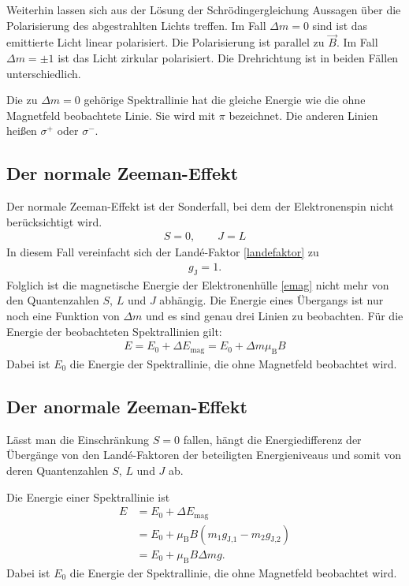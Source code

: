 Weiterhin lassen sich aus der Lösung der Schrödingergleichung Aussagen über die Polarisierung des abgestrahlten Lichts treffen.
Im Fall $\Delta m = 0$ sind ist das emittierte Licht linear polarisiert.
Die Polarisierung ist parallel zu $\vec{B}$.
Im Fall $\Delta m = \pm 1$ ist das Licht zirkular polarisiert.
Die Drehrichtung ist in beiden Fällen unterschiedlich.

Die zu $\Delta m = 0$ gehörige Spektrallinie hat die gleiche Energie wie die ohne Magnetfeld beobachtete Linie.
Sie wird mit $\pi$ bezeichnet.
Die anderen Linien heißen $\sigma^+$ oder $\sigma^-$.

\subsection{Der normale Zeeman-Effekt}
Der normale Zeeman-Effekt ist der Sonderfall, bei dem der Elektronenspin nicht berücksichtigt wird.
\begin{align}
	S = 0, \quad \quad J = L
\end{align}
In diesem Fall vereinfacht sich der Landé-Faktor \eqref{landefaktor} zu
\begin{align}
	g_\text{J} = 1.
\end{align}
Folglich ist die magnetische Energie der Elektronenhülle \eqref{emag} nicht mehr von den Quantenzahlen $S$, $L$ und $J$ abhängig.
Die Energie eines Übergangs ist nur noch eine Funktion von $\Delta m$ und es sind genau drei Linien zu beobachten.
Für die Energie der beobachteten Spektrallinien gilt:
\begin{align}
	E = E_0 + \Delta E_\text{mag} =  E_0 + \Delta m \mu_\text{B} B
\end{align}
Dabei ist $E_0$ die Energie der Spektrallinie, die ohne Magnetfeld beobachtet wird.

\subsection{Der anormale Zeeman-Effekt}
Lässt man die Einschränkung $S = 0$ fallen, hängt die Energiedifferenz der Übergänge von den Landé-Faktoren der beteiligten Energieniveaus und somit von deren Quantenzahlen $S$, $L$ und $J$ ab.

Die Energie einer Spektrallinie ist
\begin{align}
	E &= E_0 + \Delta E_\text{mag} \\
	&= E_0 + \mu_\text{B} B \left(m_1 g_\text{J,1} - m_2 g_\text{J,2} \right) \\
	&= E_0 + \mu_\text{B} B \Delta mg.
\end{align}
Dabei ist $E_0$ die Energie der Spektrallinie, die ohne Magnetfeld beobachtet wird.

